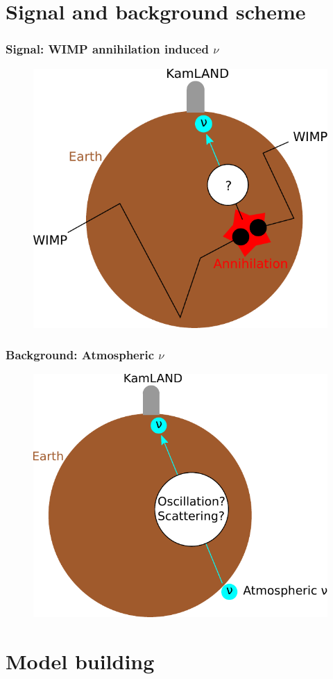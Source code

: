 \documentclass{beamer}
\begin{document}
\section{Signal and background scheme}
\begin{frame}
	\frametitle{Signal: WIMP annihilation induced $\nu$}
	\begin{figure}
		\includegraphics[width=0.6\linewidth]{detection_scheme.pdf}
	\end{figure}
\end{frame}

\begin{frame}
	\frametitle{Background: Atmospheric $\nu$}
	\centering
	\begin{figure}
		\includegraphics[width=0.6\linewidth]{background_model.pdf}
	\end{figure}
\end{frame}

\section{Model building}
\end{document}
